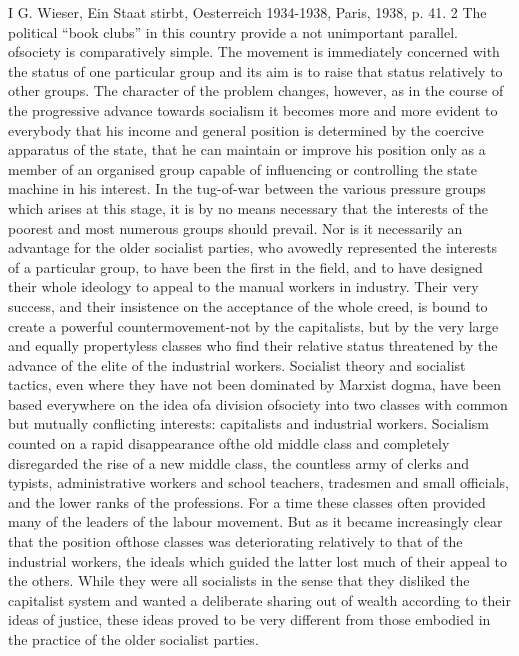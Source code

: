 \documentclass[11pt,openany]{book}
\begin{document}
I G. Wieser, Ein Staat stirbt, Oesterreich 1934-1938, Paris, 1938, p. 41. 2 The political ``book clubs'' in this country provide a not unimportant parallel. ofsociety is comparatively simple. The movement is immediately concerned with the status of one particular group and its aim is to raise that status relatively to other groups. The character of the problem changes, however, as in the course of the progressive advance towards socialism it becomes more and more evident to everybody that his income and general position is determined by the coercive apparatus of the state, that he can maintain or improve his position only as a member of an organised group capable of influencing or controlling the state machine in his interest. In the tug-of-war between the various pressure groups which arises at this stage, it is by no means necessary that the interests of the poorest and most numerous groups should prevail. Nor is it necessarily an advantage for the older socialist parties, who avowedly represented the interests of a particular group, to have been the first in the field, and to have designed their whole ideology to appeal to the manual workers in industry. Their very success, and their insistence on the acceptance of the whole creed, is bound to create a powerful countermovement-not by the capitalists, but by the very large and equally propertyless classes who find their relative status threatened by the advance of the elite of the industrial workers. Socialist theory and socialist tactics, even where they have not been dominated by Marxist dogma, have been based everywhere on the idea ofa division ofsociety into two classes with common but mutually conflicting interests: capitalists and industrial workers. Socialism counted on a rapid disappearance ofthe old middle class and completely disregarded the rise of a new middle class, the countless army of clerks and typists, administrative workers and school teachers, tradesmen and small officials, and the lower ranks of the professions. For a time these classes often provided many of the leaders of the labour movement. But as it became increasingly clear that the position ofthose classes was deteriorating relatively to that of the industrial workers, the ideals which guided the latter lost much of their appeal to the others. While they were all socialists in the sense that they disliked the capitalist system and wanted a deliberate sharing out of wealth according to their ideas of justice, these ideas proved to be very different from those embodied in the practice of the older socialist parties.
\end{document}
